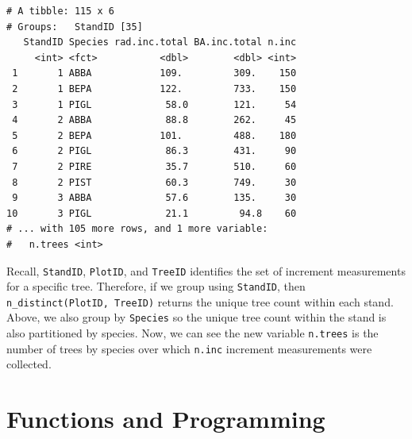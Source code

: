 \documentclass[]{krantz}
\makeatletter
\newenvironment{Shaded}{\begin{snugshade}}{\end{snugshade}}
\newcommand{\DataTypeTok}[1]{\textcolor[rgb]{0.27,0.27,0.27}{#1}}
\newcommand{\KeywordTok}[1]{\textcolor[rgb]{0.27,0.27,0.27}{\textbf{#1}}}
\newcommand{\NormalTok}[1]{#1}
\newcommand{\OperatorTok}[1]{\textcolor[rgb]{0.43,0.43,0.43}{\textbf{#1}}}
\newcommand{\StringTok}[1]{\textcolor[rgb]{0.5,0.5,0.5}{#1}}
\newenvironment{kframe}{%
\medskip{}
\setlength{\fboxsep}{.8em}
 \def\at@end@of@kframe{}%
 \ifinner\ifhmode%
  \def\at@end@of@kframe{\end{minipage}}%
  \begin{minipage}{\columnwidth}%
 \fi\fi%
 \def\FrameCommand##1{\hskip\@totalleftmargin \hskip-\fboxsep
 \colorbox{shadecolor}{##1}\hskip-\fboxsep
     \hskip-\linewidth \hskip-\@totalleftmargin \hskip\columnwidth}%
 \MakeFramed {\advance\hsize-\width
   \@totalleftmargin\z@ \linewidth\hsize
   \@setminipage}}%
 {\par\unskip\endMakeFramed%
 \at@end@of@kframe}
\renewenvironment{Shaded}{\begin{kframe}}{\end{kframe}}
\makeatother
\begin{document}
\begin{Shaded}
\end{Shaded}

\begin{verbatim}
# A tibble: 115 x 6
# Groups:   StandID [35]
   StandID Species rad.inc.total BA.inc.total n.inc
     <int> <fct>           <dbl>        <dbl> <int>
 1       1 ABBA            109.         309.    150
 2       1 BEPA            122.         733.    150
 3       1 PIGL             58.0        121.     54
 4       2 ABBA             88.8        262.     45
 5       2 BEPA            101.         488.    180
 6       2 PIGL             86.3        431.     90
 7       2 PIRE             35.7        510.     60
 8       2 PIST             60.3        749.     30
 9       3 ABBA             57.6        135.     30
10       3 PIGL             21.1         94.8    60
# ... with 105 more rows, and 1 more variable:
#   n.trees <int>
\end{verbatim}

Recall, \texttt{StandID}, \texttt{PlotID}, and \texttt{TreeID} identifies the set of increment measurements for a specific tree. Therefore, if we group using \texttt{StandID}, then \texttt{n\_distinct(PlotID,\ TreeID)} returns the unique tree count within each stand. Above, we also group by \texttt{Species} so the unique tree count within the stand is also partitioned by species. Now, we can see the new variable \texttt{n.trees} is the number of trees by species over which \texttt{n.inc} increment measurements were collected.

\hypertarget{functions-and-programming}{%
\chapter{Functions and Programming}\label{functions-and-programming}}
\end{document}
